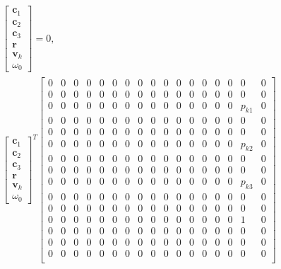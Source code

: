 \documentclass{article}
\newcommand{\mbf}[1]{\mathbf{#1}}
\begin{document}
\begin{align}
\begin{bmatrix}
        \mbf{c}_1 \\
        \mbf{c}_2 \\
        \mbf{c}_3 \\
        \mbf{r} \\
        \mbf{v}_k \\
        \omega_0
    \end{bmatrix} = 0, \\
    \begin{bmatrix}
        \mbf{c}_1 \\
        \mbf{c}_2 \\
        \mbf{c}_3 \\
        \mbf{r} \\
        \mbf{v}_k \\
        \omega_0
    \end{bmatrix}^T 
    \begin{bmatrix}
        0 & 0 & 0 & 0 & 0 & 0 & 0 & 0 & 0 & 0 & 0 & 0 & 0 & 0 & 0 & 0 & 0 \\
        0 & 0 & 0 & 0 & 0 & 0 & 0 & 0 & 0 & 0 & 0 & 0 & 0 & 0 & 0 & 0 & 0 \\
        0 & 0 & 0 & 0 & 0 & 0 & 0 & 0 & 0 & 0 & 0 & 0 & 0 & 0 & 0 & p_{k1} & 0 \\
        0 & 0 & 0 & 0 & 0 & 0 & 0 & 0 & 0 & 0 & 0 & 0 & 0 & 0 & 0 & 0 & 0 \\
        0 & 0 & 0 & 0 & 0 & 0 & 0 & 0 & 0 & 0 & 0 & 0 & 0 & 0 & 0 & 0 & 0 \\
        0 & 0 & 0 & 0 & 0 & 0 & 0 & 0 & 0 & 0 & 0 & 0 & 0 & 0 & 0 & p_{k2} & 0 \\
        0 & 0 & 0 & 0 & 0 & 0 & 0 & 0 & 0 & 0 & 0 & 0 & 0 & 0 & 0 & 0 & 0 \\
        0 & 0 & 0 & 0 & 0 & 0 & 0 & 0 & 0 & 0 & 0 & 0 & 0 & 0 & 0 & 0 & 0 \\
        0 & 0 & 0 & 0 & 0 & 0 & 0 & 0 & 0 & 0 & 0 & 0 & 0 & 0 & 0 & p_{k3} & 0 \\
        0 & 0 & 0 & 0 & 0 & 0 & 0 & 0 & 0 & 0 & 0 & 0 & 0 & 0 & 0 & 0 & 0 \\
        0 & 0 & 0 & 0 & 0 & 0 & 0 & 0 & 0 & 0 & 0 & 0 & 0 & 0 & 0 & 0 & 0 \\
        0 & 0 & 0 & 0 & 0 & 0 & 0 & 0 & 0 & 0 & 0 & 0 & 0 & 0 & 0 & 1 & 0 \\
        0 & 0 & 0 & 0 & 0 & 0 & 0 & 0 & 0 & 0 & 0 & 0 & 0 & 0 & 0 & 0 & 0 \\
        0 & 0 & 0 & 0 & 0 & 0 & 0 & 0 & 0 & 0 & 0 & 0 & 0 & 0 & 0 & 0 & 0 \\
        0 & 0 & 0 & 0 & 0 & 0 & 0 & 0 & 0 & 0 & 0 & 0 & 0 & 0 & 0 & 0 & 0 \\

\end{bmatrix}
\end{align}
\end{document}
